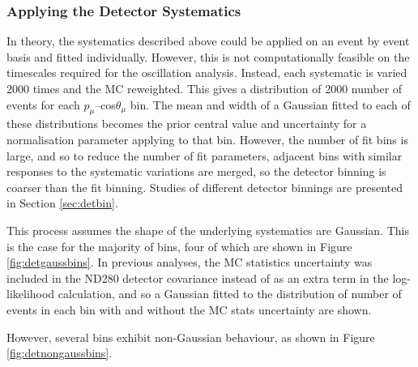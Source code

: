 \subsubsection{Applying the Detector Systematics}\label{sec:detapp}

In theory, the systematics described above could be applied on an event by event basis and fitted individually. However, this is not computationally feasible on the timescales required for the oscillation analysis. Instead, each systematic is varied 2000 times and the MC reweighted. This gives a distribution of 2000 number of events for each $p_{\mu}$--cos$\theta_{\mu}$ bin. The mean and width of a Gaussian fitted to each of these distributions becomes the prior central value and uncertainty for a normalisation parameter applying to that bin. However, the number of fit bins is large, and so to reduce the number of fit parameters, adjacent bins with similar responses to the systematic variations are merged, so the detector binning is coarser than the fit binning. Studies of different detector binnings are presented in Section \ref{sec:detbin}.

This process assumes the shape of the underlying systematics are Gaussian. This is the case for the majority of bins, four of which are shown in Figure \ref{fig:detgaussbins}. In previous analyses, the MC statistics uncertainty was included in the ND280 detector covariance instead of as an extra term in the log-likelihood calculation, and so a Gaussian fitted to the distribution of number of events in each bin with and without the MC stats uncertainty are shown.

However, several bins exhibit non-Gaussian behaviour, as shown in Figure \ref{fig:detnongaussbins}.

